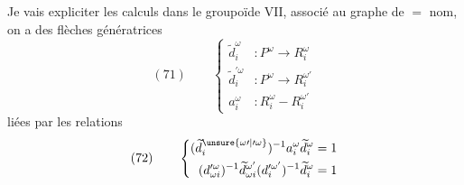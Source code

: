 Je vais expliciter les calculs dans le groupoïde $\mathrm{VII}$, associé au graphe de $=$ nom, on a des flèches génératrices
\[
(71)\qquad\left\{\begin{aligned}
\widetilde d_i^\omega&:P^\omega\longrightarrow R_i^\omega\\
\widetilde d_i^{\prime\omega}&:P^\omega\longrightarrow R_i^{\omega'}\\
a_i^\omega&:R_i^\omega\mathbin{-}R_i^{\omega'}
\end{aligned}\right.
\]
liées par les relations
\[
(72)\qquad\left\{\begin{aligned}
(\widetilde d_i^{\unsure{\omega\prime|\prime\omega}})^{-1}a_i^\omega\widetilde d_i^\omega&=1\\
(d_{\omega i}^{\prime\omega})^{-1}\widetilde d_{\omega i}^{\omega'}(d_i^{\prime\omega'})^{-1}\widetilde d_i^\omega&=1
\end{aligned}\right.
\]
